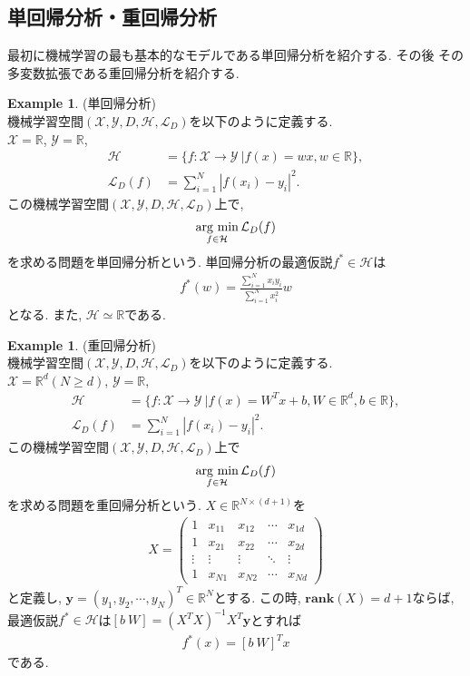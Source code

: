 \documentclass[11pt, a4paper, dvipdfmx]{jsarticle}
\theoremstyle{definition}
\newtheorem{Example+}[Axiom+]{Example}
\newcommand{\R}{\mathbb{R}}
\newcommand{\X}{\mathcal{X}}
\newcommand{\Y}{\mathcal{Y}}
\newcommand{\Hil}{\mathcal{H}}
\newcommand{\Loss}{\mathcal{L}_{D}}
\newcommand{\MLsp}{(\X, \Y, D, \Hil, \Loss)}
\newcommand{\argmin}{\mathop{\rm arg~min}\limits}
\begin{document}
\subsection{単回帰分析・重回帰分析}
最初に機械学習の最も基本的なモデルである単回帰分析を紹介する. その後
その多変数拡張である重回帰分析を紹介する.
\begin{Example+}(単回帰分析)\\
    機械学習空間$\MLsp$を以下のように定義する.\\
    $\X = \R$, $\Y = \R$, 
    \begin{align*}
        \Hil &= \{f:\X\to\Y~|f(x) = wx, w\in\R\},\\
        \Loss(f) &= \sum_{i = 1}^{N}|f(x_i) - y_i|^2.
    \end{align*}
    この機械学習空間$\MLsp$上で,
    \begin{align*}
        \argmin_{f\in\Hil}\Loss(f)
    \end{align*}
    を求める問題を単回帰分析という. 単回帰分析の最適仮説$f^{*}\in\Hil$は
    \begin{align*}
        f^{*}(w) = \frac{\sum_{i = 1}^{N}x_{i}y_{i}}{\sum_{i = 1}^{N}x_{i}^2}w
    \end{align*}
    となる. また, $\Hil\simeq\R$である.
\end{Example+}
\begin{Example+}(重回帰分析)\\
    機械学習空間$\MLsp$を以下のように定義する.\\
    $\X = \R^d(N\geq d)$, $\Y = \R$, 
    \begin{align*}
        \Hil &= \{f:\X\to\Y~| f(x) = W^{T}x + b, W\in\R^{d}, b\in\R\},\\
        \Loss(f) &= \sum_{i = 1}^{N}|f(x_i) - y_i|^2.
    \end{align*}
    この機械学習空間$\MLsp$上で
    \begin{align*}
        \argmin_{f\in\Hil}\Loss(f)
    \end{align*}
    を求める問題を重回帰分析という. $X\in\R^{N\times(d + 1)}$を
    \begin{align*}
        X = \begin{pmatrix}
            1 & x_{11} & x_{12} & \cdots & x_{1d}\\
            1 & x_{21} & x_{22} & \cdots & x_{2d}\\
            \vdots & \vdots & \vdots & \ddots & \vdots\\
            1 & x_{N1} & x_{N2} & \cdots & x_{Nd}
        \end{pmatrix}
    \end{align*}
    と定義し, $\mathbf{y} = (y_{1}, y_{2}, \cdots, y_{N})^{T}\in\R^{N}$とする. この時, $\mathbf{rank}(X) = d + 1$ならば, 
    最適仮説$f^*\in\Hil$は$[b~W] = (X^TX)^{-1}X^T\mathbf{y}$とすれば
    \begin{align*}
        f^{*}(x) = [b~W]^{T}x
    \end{align*}
    である.
\end{Example+}
\end{document}
